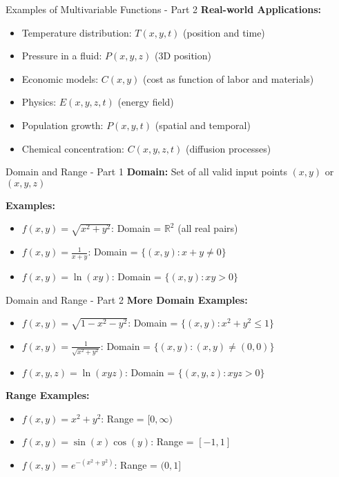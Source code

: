 \documentclass[aspectratio=169]{beamer}
\begin{document}
\begin{frame}{Examples of Multivariable Functions - Part 2}
\textbf{Real-world Applications:}
\begin{itemize}
    \item Temperature distribution: $T(x,y,t)$ (position and time)
    \item Pressure in a fluid: $P(x,y,z)$ (3D position)
    \item Economic models: $C(x,y)$ (cost as function of labor and materials)
    \item Physics: $E(x,y,z,t)$ (energy field)
    \item Population growth: $P(x,y,t)$ (spatial and temporal)
    \item Chemical concentration: $C(x,y,z,t)$ (diffusion processes)
\end{itemize}
\end{frame}

\begin{frame}{Domain and Range - Part 1}
\textbf{Domain:} Set of all valid input points $(x,y)$ or $(x,y,z)$

\textbf{Examples:}
\begin{itemize}
    \item $f(x,y) = \sqrt{x^2 + y^2}$: Domain = $\mathbb{R}^2$ (all real pairs)
    \item $f(x,y) = \frac{1}{x + y}$: Domain = $\{(x,y) : x + y \neq 0\}$
    \item $f(x,y) = \ln(xy)$: Domain = $\{(x,y) : xy > 0\}$
\end{itemize}
\end{frame}

\begin{frame}{Domain and Range - Part 2}
\textbf{More Domain Examples:}
\begin{itemize}
    \item $f(x,y) = \sqrt{1 - x^2 - y^2}$: Domain = $\{(x,y) : x^2 + y^2 \leq 1\}$
    \item $f(x,y) = \frac{1}{\sqrt{x^2 + y^2}}$: Domain = $\{(x,y) : (x,y) \neq (0,0)\}$
    \item $f(x,y,z) = \ln(xyz)$: Domain = $\{(x,y,z) : xyz > 0\}$
\end{itemize}

\textbf{Range Examples:}
\begin{itemize}
    \item $f(x,y) = x^2 + y^2$: Range = $[0, \infty)$
    \item $f(x,y) = \sin(x) \cos(y)$: Range = $[-1, 1]$
    \item $f(x,y) = e^{-(x^2 + y^2)}$: Range = $(0, 1]$
\end{itemize}
\end{frame}
\end{document}
